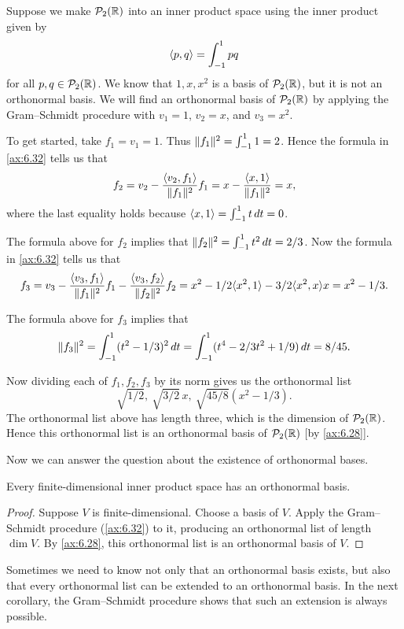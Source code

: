 \begin{example}\label{ax:6.34}
Suppose we make $\mathcal{P}_2(\mathbb{R})$ into an inner product space using the inner product
given by
\[ \langle p, q \rangle = \int_{-1}^{1} pq \]
for all $p,q\in\mathcal{P}_2(\mathbb{R})$. We know that $1,x,x^2$ is a basis of $\mathcal{P}_2(\mathbb{R})$,
but it is not an orthonormal basis. We will find an orthonormal basis of
$\mathcal{P}_2(\mathbb{R})$ by applying the Gram--Schmidt procedure with $v_1=1$, $v_2=x$,
and $v_3=x^2$.

To get started, take $f_1=v_1=1$. Thus $\lVert f_1 \rVert^2=\int_{-1}^{1}1=2$. Hence
the formula in \ref{ax:6.32} tells us that
\[ f_2 = v_2-\frac{\langle v_2, f_1 \rangle}{\lVert f_1 \rVert^2}f_1
       = x-\frac{\langle x, 1 \rangle}{\lVert f_1 \rVert^2} = x, \]
where the last equality holds because $\langle x, 1 \rangle=\int_{-1}^{1}t\,dt=0$.

The formula above for $f_2$ implies that
$\lVert f_2 \rVert^2=\int_{-1}^{1}t^2\,dt=2/3$. Now the formula in \ref{ax:6.32}
tells us that
\[ f_3 = v_3-\frac{\langle v_3, f_1 \rangle}{\lVert f_1 \rVert^2}f_1
            -\frac{\langle v_3, f_2 \rangle}{\lVert f_2 \rVert^2}f_2
       = x^2-1/2\langle x^2, 1 \rangle-3/2\langle x^2, x \rangle x = x^2-1/3. \]

The formula above for $f_3$ implies that
\[ \lVert f_3 \rVert^2 = \int_{-1}^{1}(t^2-1/3)^2\,dt
   = \int_{-1}^{1}(t^4-2/3t^2+1/9)\,dt = 8/45. \]

Now dividing each of $f_1,f_2,f_3$ by its norm gives us the orthonormal list
\[ \sqrt{1/2},\ \sqrt{3/2}\,x,\
   \sqrt{45/8}(x^2-1/3). \]
The orthonormal list above has length three, which is the dimension of
$\mathcal{P}_2(\mathbb{R})$. Hence this orthonormal list is an orthonormal basis of
$\mathcal{P}_2(\mathbb{R})$ [by \ref{ax:6.28}].
\end{example}

Now we can answer the question about the existence of orthonormal bases.

\begin{result}\label{ax:6.35}
Every finite-dimensional inner product space has an orthonormal basis.
\end{result}

\begin{proof}
Suppose $V$ is finite-dimensional. Choose a basis of $V$. Apply the
Gram--Schmidt procedure (\ref{ax:6.32}) to it, producing an orthonormal list of
length $\dim V$. By \ref{ax:6.28}, this orthonormal list is an orthonormal basis
of $V$.
\end{proof}

Sometimes we need to know not only that an orthonormal basis exists, but also
that every orthonormal list can be extended to an orthonormal basis. In the next
corollary, the Gram--Schmidt procedure shows that such an extension is always
possible.

